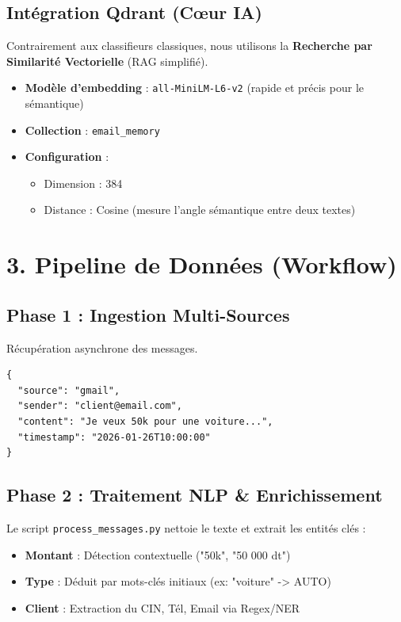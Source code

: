 \documentclass[11pt]{article}
\begin{document}
\subsection{Intégration Qdrant (Cœur IA)}
Contrairement aux classifieurs classiques, nous utilisons la \textbf{Recherche par Similarité Vectorielle} (RAG simplifié).
\begin{itemize}
    \item \textbf{Modèle d'embedding} : \texttt{all-MiniLM-L6-v2} (rapide et précis pour le sémantique)
    \item \textbf{Collection} : \texttt{email\_memory}
    \item \textbf{Configuration} :
    \begin{itemize}
        \item Dimension : 384
        \item Distance : Cosine (mesure l'angle sémantique entre deux textes)
    \end{itemize}
\end{itemize}

\section{3. Pipeline de Données (Workflow)}

\subsection{Phase 1 : Ingestion Multi-Sources}
Récupération asynchrone des messages.
\begin{lstlisting}
{
  "source": "gmail",
  "sender": "client@email.com",
  "content": "Je veux 50k pour une voiture...",
  "timestamp": "2026-01-26T10:00:00"
}
\end{lstlisting}

\subsection{Phase 2 : Traitement NLP & Enrichissement}
Le script \texttt{process\_messages.py} nettoie le texte et extrait les entités clés :
\begin{itemize}
    \item \textbf{Montant} : Détection contextuelle ("50k", "50 000 dt")
    \item \textbf{Type} : Déduit par mots-clés initiaux (ex: "voiture" -> AUTO)
    \item \textbf{Client} : Extraction du CIN, Tél, Email via Regex/NER
\end{itemize}
\end{document}

